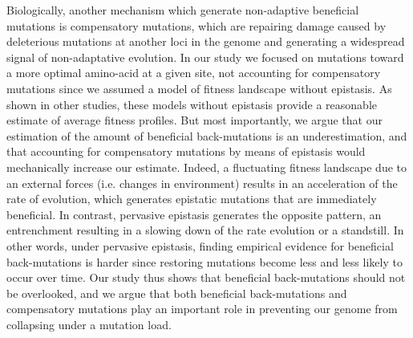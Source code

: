 \documentclass{article}
\begin{document}
    Biologically, another mechanism which generate non-adaptive beneficial mutations is compensatory mutations, which are repairing damage caused by deleterious mutations at another loci in the genome and generating a widespread signal of non-adaptative evolution\cite{hartl_compensatory_1996, pollock_strong_2014, starr_epistasis_2016}.
    In our study we focused on mutations toward a more optimal amino-acid at a given site, not accounting for compensatory mutations since we assumed a model of fitness landscape without epistasis.
    As shown in other studies, these models without epistasis provide a reasonable estimate of average fitness profiles\cite{youssef_consequences_2020}.
    But most importantly, we argue that our estimation of the amount of beneficial back-mutations is an underestimation, and that accounting for compensatory mutations by means of epistasis would mechanically increase our estimate.
    Indeed, a fluctuating fitness landscape due to an external forces (i.e. changes in environment) results in an acceleration of the rate of evolution\cite{ rodrigue_detecting_2017, rodrigue_bayesian_2021}, which generates epistatic mutations that are immediately beneficial\cite{gong_epistatically_2014}.
    In contrast, pervasive epistasis generates the opposite pattern, an entrenchment\cite{goldstein_evolutionary_2004, goldstein_nonadaptive_2015} resulting in a slowing down of the rate evolution\cite{rodrigue_detecting_2017, patel_epistasis_2022} or a standstill\cite{youssef_evolution_2022}.
    In other words, under pervasive epistasis, finding empirical evidence for beneficial back-mutations is harder since restoring mutations become less and less likely to occur over time\cite{goldstein_nonadaptive_2015, goldstein_sequence_2017, park_epistatic_2022}.
    Our study thus shows that beneficial back-mutations should not be overlooked, and we argue that both beneficial back-mutations and compensatory mutations play an important role in preventing our genome from collapsing under a mutation load.
\end{document}
